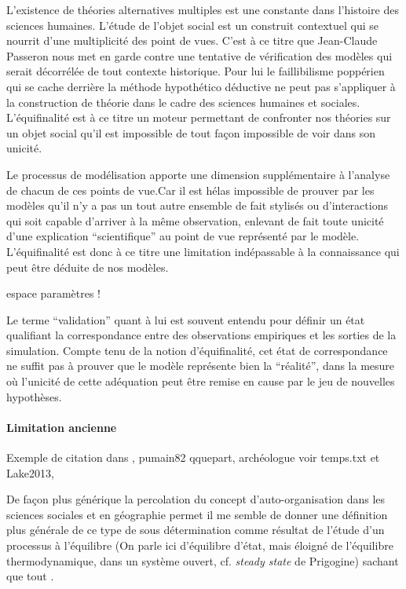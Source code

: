 L’existence de théories alternatives multiples est une constante dans l’histoire des sciences humaines. L'étude de l'objet social est un construit contextuel qui se nourrit d'une multiplicité des point de vues. C'est à ce titre que Jean-Claude Passeron \autocite{Passeron2006} nous met en garde contre une tentative de vérification des modèles qui serait décorrélée de tout contexte historique. Pour lui le faillibilisme poppérien qui se cache derrière la méthode hypothético déductive ne peut pas s'appliquer à la construction de théorie dans le cadre des sciences humaines et sociales. L'équifinalité est à ce titre un moteur permettant de confronter nos théories sur un objet social  qu'il est impossible de tout façon impossible de voir dans son unicité.

Le processus de modélisation apporte une dimension supplémentaire à l'analyse de chacun de ces points de vue.Car il est hélas impossible de prouver par les modèles qu'il n'y a pas un tout autre ensemble de fait stylisés ou d'interactions qui soit capable d'arriver à la même observation, enlevant de fait toute unicité d’une explication \enquote{scientifique} au point de vue représenté par le modèle. L'équifinalité est donc à ce titre une limitation indépassable à la connaissance qui peut être déduite de nos modèles.

espace paramètres !

Le terme \enquote{validation} quant à lui est souvent entendu pour définir un état qualifiant la correspondance entre des observations empiriques et les sorties de la simulation. Compte tenu de la notion d'équifinalité, cet état de correspondance ne suffit pas à prouver que le modèle représente bien la \enquote{réalité}, dans la mesure où l’unicité de cette adéquation peut être remise en cause par le jeu de nouvelles hypothèses.

\paragraph{Limitation ancienne}
Exemple de citation dans \textcite[192]{Sheps1971}, pumain82 qquepart, archéologue voir temps.txt et Lake2013,

De façon plus générique la percolation du concept d'auto-organisation dans les sciences sociales et en géographie permet il me semble de donner une définition plus générale de ce type de sous détermination comme résultat de l'étude d'un processus à l'équilibre (On parle ici d'équilibre d'état, mais éloigné de l'équilibre thermodynamique, dans un système ouvert, cf. \textit{steady state} de Prigogine) sachant que tout .

